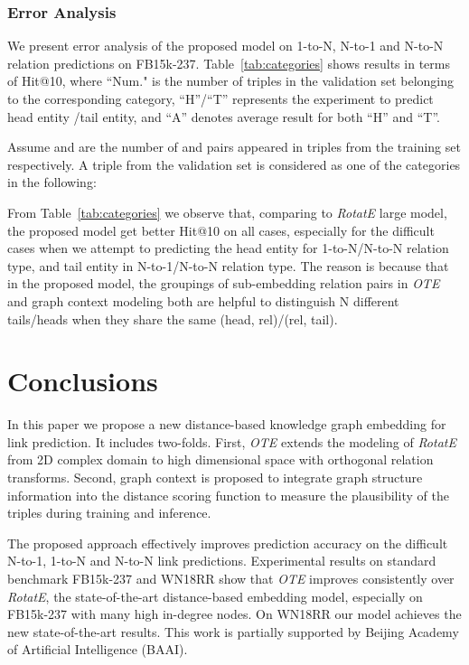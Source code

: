\documentclass[11pt,a4paper]{article}
\begin{document}
\subsubsection{Error Analysis}
We present error analysis of the proposed model on 1-to-N, N-to-1 and N-to-N relation predictions on FB15k-237. Table~\ref{tab:categories} shows results in terms of Hit@10, where ``Num." is the number of triples in the validation set belonging to the corresponding category, ``H''/``T'' represents the experiment to predict head entity /tail entity, and ``A'' denotes average result for both ``H'' and ``T''.






Assume  and  are the number of  and  pairs appeared in triples from the training set respectively.  A triple  from the validation set is considered as one of the categories in the following:


From Table~\ref{tab:categories} we observe that, comparing to \textit{RotatE} large model, the proposed model get better Hit@10 on all cases, especially for the difficult cases when we attempt to predicting the head entity for 1-to-N/N-to-N relation type, and tail entity in N-to-1/N-to-N relation type. The reason is because that in the proposed model, the groupings of sub-embedding relation pairs in {\it OTE} and graph context modeling both are helpful to distinguish N different tails/heads when they share the same (head, rel)/(rel, tail). 







\section{Conclusions}
In this paper we propose a new distance-based knowledge graph embedding for link prediction. It includes two-folds. First, {\it OTE} extends the modeling of {\it RotatE} from 2D complex domain to high dimensional space with orthogonal relation transforms. Second, graph context is proposed to integrate graph structure information into the distance scoring function to measure the plausibility of the triples during training and inference.





The proposed 
approach effectively improves prediction accuracy on the difficult N-to-1, 1-to-N and N-to-N link predictions. 
Experimental results on standard benchmark FB15k-237 and WN18RR show that {\it OTE} improves consistently over {\it RotatE}, the state-of-the-art distance-based embedding model, especially on FB15k-237 with many high in-degree nodes. On WN18RR our model achieves the new state-of-the-art results. This work is partially supported by Beijing Academy of Artificial Intelligence (BAAI).
\end{document}
